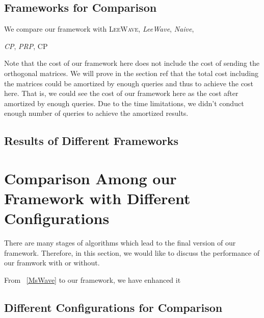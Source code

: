 \subsection{Frameworks for Comparison} %
\label{ss:frameworks_for_comparison}

We compare our framework with 
\textsc{LeeWave},
\emph{LeeWave},
\emph{Naive},

\emph{CP},
\emph{PRP},
\textsc{CP}

Note that the cost of our framework here does not include the cost of sending the orthogonal matrices.  We will prove in the section ref that the total cost including the matrices could be amortized by enough queries and thus to achieve the cost here.  That is, we could see the cost of our framework here as the cost after amortized by enough queries.  Due to the time limitations, we didn't conduct enough number of queries to achieve the amortized results.



\subsection{Results of Different Frameworks} %
\label{sub:results_of_different_fra}








\section{Comparison Among our Framework with Different Configurations} %
\label{s:comparison_among_our_framework_with_different_configurations}

There are many stages of algorithms which lead to the final version of our framework.  Therefore, in this section, we would like to discuss the performance of our framwork with or without.

From ~\ref{MsWave} to our framework, we have enhanced it

\subsection{Different Configurations for Comparison} %
\label{sub:different_configurations_for_comparison}

